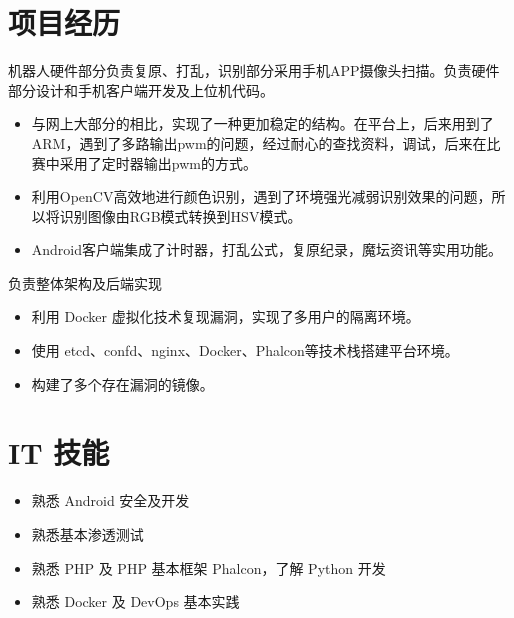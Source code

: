 \documentclass{resume}
\begin{document}
\pagestyle{empty}

\section{项目经历}

\begin{onehalfspacing}
机器人硬件部分负责复原、打乱，识别部分采用手机APP摄像头扫描。负责硬件部分设计和手机客户端开发及上位机代码。
\begin{itemize}
  \item 与网上大部分的相比，实现了一种更加稳定的结构。在平台上，后来用到了ARM，遇到了多路输出pwm的问题，经过耐心的查找资料，调试，后来在比赛中采用了定时器输出pwm的方式。
  \item 利用OpenCV高效地进行颜色识别，遇到了环境强光减弱识别效果的问题，所以将识别图像由RGB模式转换到HSV模式。
  \item Android客户端集成了计时器，打乱公式，复原纪录，魔坛资讯等实用功能。
\end{itemize}
\end{onehalfspacing}

\begin{onehalfspacing}
负责整体架构及后端实现
\begin{itemize}
  \item 利用 Docker 虚拟化技术复现漏洞，实现了多用户的隔离环境。
  \item 使用 etcd、confd、nginx、Docker、Phalcon等技术栈搭建平台环境。
  \item 构建了多个存在漏洞的镜像。
\end{itemize}
\end{onehalfspacing}

\section{IT 技能}
\begin{onehalfspacing}
\begin{itemize}[parsep=0.5ex]
  \item 熟悉 Android 安全及开发
  \item 熟悉基本渗透测试
  \item 熟悉 PHP 及 PHP 基本框架 Phalcon，了解 Python 开发
  \item 熟悉 Docker 及 DevOps 基本实践
\end{itemize}
\end{onehalfspacing}
\end{document}
